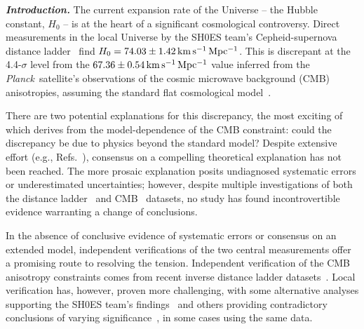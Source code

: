 \documentclass[%
 reprint,
 superscriptaddress,
 nofootinbib,
 amsmath,amssymb,
 aps,
]{revtex4-2}
\newcommand{\hubble}{\ensuremath{H_0}}
\newcommand{\kmsmpc}{\ensuremath{{\rm km\,s^{-1}\,Mpc^{-1}}}}
\newcommand{\planck}{{\it Planck}}
\begin{document}


\textbf{\emph{ Introduction.}} The current expansion rate of the Universe -- the Hubble constant, $H_0$ -- is at the heart of a significant cosmological controversy. Direct measurements in the local Universe by the SH0ES team's Cepheid-supernova distance ladder~\cite{Riess_etal:2019} find $\hubble = 74.03 \pm 1.42 \,\kmsmpc$. This is discrepant at the 4.4-$\sigma$ level from the $67.36 \pm 0.54\,\kmsmpc$ value inferred from the \planck\ satellite's observations of the cosmic microwave background (CMB) anisotropies, assuming the standard flat cosmological model~\cite{Planck_VI:2018}.

There are two potential explanations for this discrepancy, the most exciting of which derives from the model-dependence of the CMB constraint: could the discrepancy be due to physics beyond the standard model? Despite extensive effort
(e.g., Refs.~\cite{Knox_Millea:2020,Vagnozzi:2020}), consensus on a compelling theoretical explanation has not been reached. The more prosaic explanation posits undiagnosed systematic errors or underestimated uncertainties; however, despite multiple investigations of both the distance ladder~\cite{Efstathiou:2014,*Rigault_etal:2015,*Jones_etal:2015,*Cardona_etal:2016,*Zhang_etal:2017,*Follin_Knox:2017,*Feeney_etal:2017,*Wu_Huterer:2017,*Dhawan_etal:2017,*Bengaly_etal:2018,*Rigault_etal:2018,*Jones_etal:2018,*Riess_etal:2020,*Efstathiou:2020} and CMB~\cite{Spergel_etal:2015,*Addison_etal:2016,*Obied_etal:2017,*Calabrese_etal:2017,*Efstathiou_Gratton:2019,*Motloch_Hu:2020,*ACT:2020} datasets, no study has found incontrovertible evidence warranting a change of conclusions.

In the absence of conclusive evidence of systematic errors or consensus on an extended model, independent verifications of the two central measurements offer a promising route to resolving the tension. Independent verification of the CMB anisotropy constraints comes from recent inverse distance ladder datasets~\cite{Addison_etal:2017,*DES_H_0:2017,*Philcox_etal:2020}. Local verification has, however, proven more challenging, with some alternative analyses supporting the SH0ES team's findings~\cite{Yuan_etal:2019,*Huang_etal:2020,*H0LICOW_XIII:2020,*TDCOSMO_I:2020,*Pesce_etal:2020} and others providing contradictory conclusions of varying significance~\cite{Freedman_etal:2019,*Freedman_etal:2020,*TDCOSMO_IV:2020,*Boruah_etal:2020}, in some cases using the same data.
\end{document}
